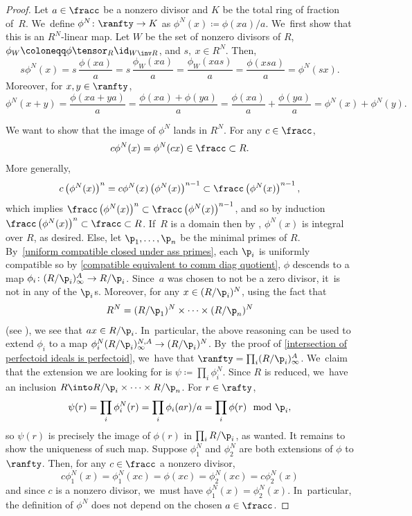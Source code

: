\begin{proof}
Let $a\in \fracc$ be a nonzero divisor and $K$ be the total ring of fraction of~$R$. We~define $\phi^N\colon \ranfty \to K$ as
$\phi^N
(x)\coloneqq \phi(xa)/a$. We~first show that this is an $R^N$\nobreakdash-linear map. Let $W$ be the set of nonzero divisors of $R$, $\phi_W\coloneqq \phi\tensor_R \id_{W\inv R}$, and $s,\ x\in R^N$. Then,
\[
s \phi^N(x)=s\,\frac{\phi(xa)}{a}=s\,\frac{\phi_W(xa)}{a}=\frac{\phi_W(xas)}{a}=\frac{\phi(xsa)}{a}=\phi^N(sx).
\]
Moreover, for $x,y\in \ranfty$,
\[
\phi^N(x+y)=\frac{\phi(xa+ya)}{a}=\frac{\phi(xa)+\phi(ya)}{a}=\frac{\phi(xa)}{a}+\frac{\phi(ya)}{a}=\phi^N(x)+\phi^N(y).
\]

We want to show that the image of $\phi^N$ lands in $R^N$. For any $c\in \fracc$,
\[c\phi^N(x)=\phi^N(cx)\in \fracc\subset R.\] More generally,
\[
c\left(\phi^N(x)\right)^n=c\phi^N(x)\left(\phi^N(x)\right)^{n-1}\subset \fracc \left(\phi^N(x)\right)^{n-1},
\]
which implies $\fracc\left(\phi^N(x)\right)^n\subset \fracc\left(\phi^N(x)\right)^{n-1}$, and so by induction $\fracc\left(\phi^N(x)\right)^n\subset \fracc\subset R$. If~$R$ is a domain then by \cite[Prop.\,2.4.8]{HunekeSwansonIntegralClosure}, $\phi^N(x)$ is integral over $R$, as desired. Else, let $\p_1,\ldots,\p_n$ be the minimal primes of $R$. By~\autoref{uniform compatible closed under ass primes}, each $\p_i$ is uniformly compatible so by \autoref{compatible equivalent to comm diag quotient}, $\phi$ descends to a map $\phi_i\colon (R/\p_i)^A_\infty\to R/\p_i$.
Since~$a$ was chosen to not be a zero divisor, it~is not in any of the $\p_i$s. Moreover, for any $x\in (R/\p_i)^N$, using the fact that
\[R^N=(R/\p_1)^N\times \cdots \times (R/\p_n)^N\]
(see \eg \cite[Cor.\,2.1.13]{HunekeSwansonIntegralClosure}),
we see that $ax\in R/\p_i$. In~particular, the above reasoning can be used to extend $\phi_i$ to a map $\phi_i^N(R/\p_i)^{N,A}_\infty \to (R/\p_i)^N$. By~the proof of \autoref{intersection of perfectoid ideals is perfectoid}, we~have that $\ranfty=\prod_i (R/\p_i)^A_\infty$. We~claim that the extension we are looking for is $\psi\coloneqq \prod_i \phi^N_i$. Since $R$ is reduced, we~have an inclusion $R\into R/\p_i\times \cdots \times R/\p_n$.
For $r\in \rafty$,
\[
\psi(r)=\prod_i \phi^N_i(r)=\prod_i \phi_i(ar)/a=\prod_i \phi(r) \mod{\p_i},
\]
so $\psi(r)$ is precisely the image of $\phi(r)$ in $\prod_i R/\p_i$, as wanted.
It remains to show the uniqueness of such map. Suppose $\phi^N_1$ and $\phi^N_2$ are both extensions of $\phi$ to $\ranfty$. Then, for any $c\in \fracc$ a nonzero divisor,
\[
c\phi^N_1(x)=\phi^N_1(xc)=\phi(xc)=\phi^N_2(xc)=c\phi^N_2(x)
\]
and since $c$ is a nonzero divisor, we~must have $\phi^N_1(x)=\phi^N_2(x)$. In~particular, the definition of $\phi^N$ does not depend on the chosen $a\in \fracc$.
\end{proof}

